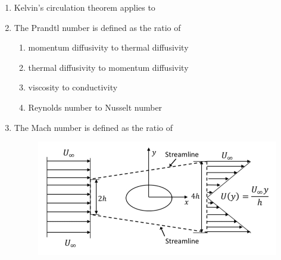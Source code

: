 \documentclass[journal,12pt,onecolumn]{IEEEtran}
\theoremstyle{remark}
\begin{document}
\begin{enumerate}
\begin{enumerate}[label=\Alph*.]
\end{enumerate}

\item Kelvin’s circulation theorem applies to\hfill{}

\begin{enumerate}[label=\Alph*.]
\end{enumerate}

\item The Prandtl number is defined as the ratio of\hfill{}

\begin{enumerate}[label=\Alph*.]
\item momentum diffusivity to thermal diffusivity
\item thermal diffusivity to momentum diffusivity 
\item viscosity to conductivity 
\item Reynolds number to Nusselt number
\end{enumerate}

\item The Mach number is defined as the ratio of\hfill{}

\begin{figure}[H]
    \centering
    \includegraphics[scale=0.4]{figs/q46.jpg}
    \caption{}
    \label{fig:figure1}
\end{figure}


\end{enumerate}
\end{document}
